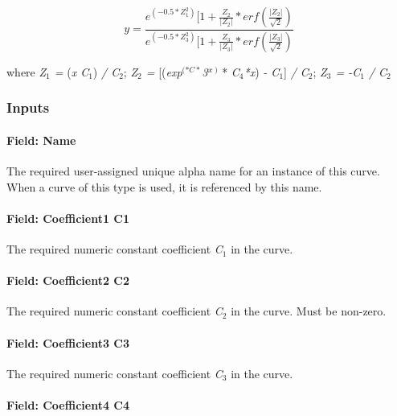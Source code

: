 \begin{equation}
y = \frac{{{e^{( - 0.5*Z_1^2)}}[1 + \frac{{{Z_2}}}{{\left| {{Z_2}} \right|}}*erf\left( {\frac{{\left| {{Z_2}} \right|}}{{\sqrt 2 }}} \right)}}{{{e^{( - 0.5*Z_3^2)}}[1 + \frac{{{Z_3}}}{{\left| {{Z_3}} \right|}}*erf\left( {\frac{{\left| {{Z_3}} \right|}}{{\sqrt 2 }}} \right)}}
\end{equation}

where \emph{Z\(_{1}\) =} (\emph{x C\(_{1}\)}) \emph{/ C\(_{2}\)}; \emph{Z\(_{2}\) =} {[}(\emph{exp}\(^{(*C*}\)\emph{3\(^{\*x}\)}\(^{)}\) * \emph{C\(_{4}\)*x}) \emph{- C\(_{1}\)}{]} \emph{/ C\(_{2}\)}; \emph{Z\(_{3}\) = -C\(_{1}\) / C\(_{2}\)}

\subsubsection{Inputs}\label{inputs-13-008}

\paragraph{Field: Name}\label{field-name-13-006}

The required user-assigned unique alpha name for an instance of this curve. When a curve of this type is used, it is referenced by this name.

\paragraph{Field: Coefficient1 C1}\label{field-coefficient1-c1}

The required numeric constant coefficient \emph{C\(_{1}\)} in the curve.

\paragraph{Field: Coefficient2 C2}\label{field-coefficient2-c2}

The required numeric constant coefficient \emph{C\(_{2}\)} in the curve. Must be non-zero.

\paragraph{Field: Coefficient3 C3}\label{field-coefficient3-c3}

The required numeric constant coefficient \emph{C\(_{3}\)} in the curve.

\paragraph{Field: Coefficient4 C4}\label{field-coefficient4-c4}

